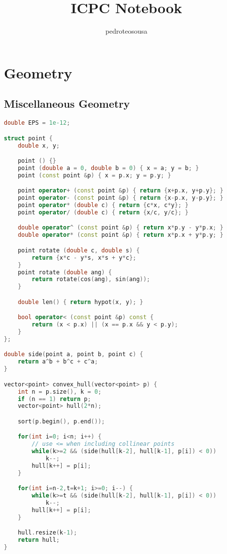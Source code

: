 \documentclass{article}
\title{ICPC Notebook}
\author{pedroteosousa }
\date{}
\begin{document}

\maketitle
\tableofcontents

\section{Geometry}
\subsection{Miscellaneous Geometry}
\begin{lstlisting}[language=C++]
double EPS = 1e-12;

struct point {
	double x, y;

	point () {}
	point (double a = 0, double b = 0) { x = a; y = b; }
	point (const point &p) { x = p.x; y = p.y; }

	point operator+ (const point &p) { return {x+p.x, y+p.y}; }
	point operator- (const point &p) { return {x-p.x, y-p.y}; }
	point operator* (double c) { return {c*x, c*y}; }
	point operator/ (double c) { return {x/c, y/c}; }

	double operator^ (const point &p) { return x*p.y - y*p.x; }
	double operator* (const point &p) { return x*p.x + y*p.y; }

	point rotate (double c, double s) {
		return {x*c - y*s, x*s + y*c}; 
	}
	point rotate (double ang) {
		return rotate(cos(ang), sin(ang));
	}

	double len() { return hypot(x, y); }

	bool operator< (const point &p) const {
		return (x < p.x) || (x == p.x && y < p.y);
	}
};

double side(point a, point b, point c) {
	return a^b + b^c + c^a;
}

vector<point> convex_hull(vector<point> p) {
	int n = p.size(), k = 0;
	if (n == 1) return p;
	vector<point> hull(2*n);

	sort(p.begin(), p.end());

	for(int i=0; i<n; i++) {
		// use <= when including collinear points
		while(k>=2 && (side(hull[k-2], hull[k-1], p[i]) < 0))
			k--;
		hull[k++] = p[i];
	}

	for(int i=n-2,t=k+1; i>=0; i--) {
		while(k>=t && (side(hull[k-2], hull[k-1], p[i]) < 0))
			k--;
		hull[k++] = p[i];
	}

	hull.resize(k-1);
	return hull;
}
\end{lstlisting}
\end{document}

